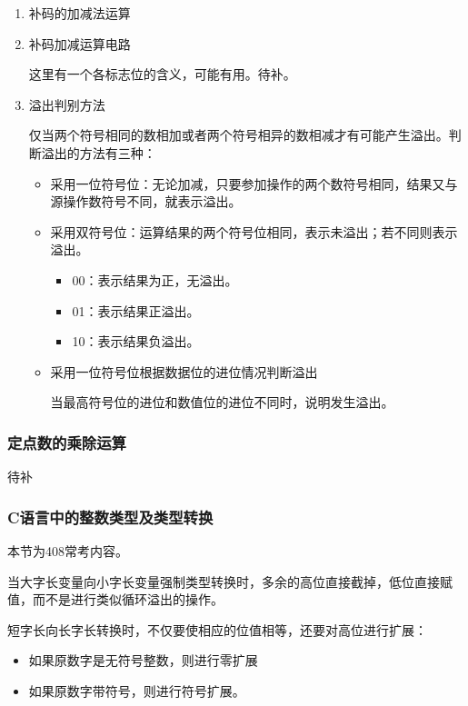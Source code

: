 \documentclass[12pt, a4paper, oneside]{ctexart}
\begin{document}
\begin{enumerate}
  \item {\kaishu 补码的加减法运算}
  \item {\kaishu 补码加减运算电路}
  
  这里有一个各标志位的含义，可能有用。待补。
  \item {\kaishu 溢出判别方法}
  
  仅当两个符号相同的数相加或者两个符号相异的数相减才有可能产生溢出。判断溢出的方法有三种：
  \begin{itemize}
    \item 采用一位符号位：无论加减，只要参加操作的两个数符号相同，结果又与源操作数符号不同，就表示溢出。
    \item 采用双符号位：运算结果的两个符号位相同，表示未溢出；若不同则表示溢出。
    \begin{itemize}
      \item 00：表示结果为正，无溢出。
      \item 01：表示结果正溢出。
      \item 10：表示结果负溢出。
    \end{itemize}
    \item 采用一位符号位根据数据位的进位情况判断溢出
    
    当最高符号位的进位和数值位的进位不同时，说明发生溢出。
  \end{itemize}
\end{enumerate}

\subsubsection{定点数的乘除运算}

待补

\subsubsection{C语言中的整数类型及类型转换}

本节为408常考内容。

当大字长变量向小字长变量强制类型转换时，多余的高位直接截掉，低位直接赋值，而不是进行类似循环溢出的操作。

短字长向长字长转换时，不仅要使相应的位值相等，还要对高位进行扩展：
\begin{itemize}
  \item 如果原数字是无符号整数，则进行零扩展
  \item 如果原数字带符号，则进行符号扩展。
\end{itemize}
\end{document}
